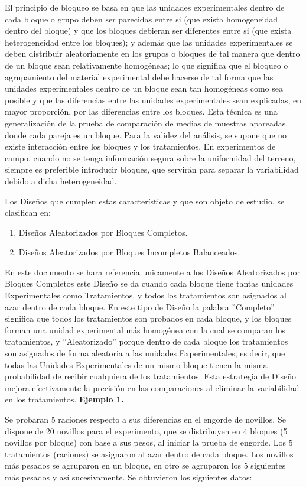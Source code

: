 \documentclass[12pt,letterpaper]{report}
\begin{document}
El principio de bloqueo se basa en que las unidades experimentales dentro de cada
bloque o grupo deben ser parecidas entre si (que exista homogeneidad dentro del bloque) y
que los bloques debieran ser diferentes entre si (que exista heterogeneidad entre los bloques);
y además que las unidades experimentales se deben distribuir aleatoriamente en los grupos o
bloques de tal manera que dentro de un bloque sean relativamente homogéneas; lo que
significa que el bloqueo o agrupamiento del material experimental debe hacerse de tal forma
que las unidades experimentales dentro de un bloque sean tan homogéneas como sea posible y
que las diferencias entre las unidades experimentales sean explicadas, en mayor proporción,
por las diferencias entre los bloques. Esta técnica es una generalización de la prueba de
comparación de medias de muestras apareadas, donde cada pareja es un bloque. Para la
validez del análisis, se supone que no existe interacción entre los bloques y los tratamientos.
En experimentos de campo, cuando no se tenga información segura sobre la
uniformidad del terreno, siempre es preferible introducir bloques, que servirán para separar la
variabilidad debido a dicha heterogeneidad.

Los Diseños que cumplen estas características y que son objeto de estudio, se
clasifican en:
\begin{enumerate}
  \item Diseños Aleatorizados por Bloques Completos.
  \item Diseños Aleatorizados por Bloques Incompletos Balanceados.
\end{enumerate}
En este documento se hara referencia unicamente a los Diseños Aleatorizados por Bloques Completos este Diseño se da cuando cada bloque tiene tantas unidades Experimentales como
Tratamientos, y todos los tratamientos son asignados al azar dentro de cada bloque.
En este tipo de Diseño la palabra ”Completo” significa que todos los tratamientos son
probados en cada bloque, y los bloques forman una unidad experimental más homogénea con
la cual se comparan los tratamientos, y ”Aleatorizado” porque dentro de cada bloque los
tratamientos son asignados de forma aleatoria a las unidades Experimentales; es decir, que
todas las Unidades Experimentales de un mismo bloque tienen la misma probabilidad de recibir
cualquiera de los tratamientos. Esta estrategia de Diseño mejora efectivamente la precisión en
las comparaciones al eliminar la variabilidad en los tratamientos.
\newpage
\textbf{Ejemplo 1.}

Se probaran 5 raciones respecto a sus diferencias en el engorde de novillos. Se dispone de 20
novillos para el experimento, que se distribuyen en 4 bloques (5 novillos por bloque) con base
a sus pesos, al iniciar la prueba de engorde. Los 5 tratamientos (raciones) se asignaron al azar
dentro de cada bloque. Los novillos más pesados se agruparon en un bloque, en otro se
agruparon los 5 siguientes más pesados y así sucesivamente. Se obtuvieron los siguientes
datos:
\end{document}
